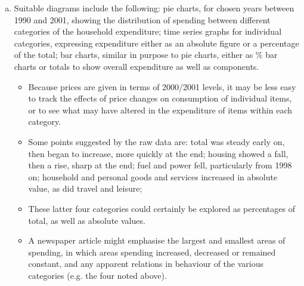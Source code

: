 \documentclass[a4paper,12pt]{article}
\begin{document}
 
\begin{enumerate}[(a)]
\item Suitable diagrams include the following:
pie charts, for chosen years between 1990 and 2001, showing the distribution
of spending between different categories of the household expenditure;
time series graphs for individual categories, expressing expenditure either as
an absolute figure or a percentage of the total;
bar charts, similar in purpose to pie charts, either as \% bar charts or totals to
show overall expenditure as well as components.
\begin{itemize}
    \item Because prices are given in terms of 2000/2001 levels, it may be less easy to track the
effects of price changes on consumption of individual items, or to see what may have
altered in the expenditure of items within each category.
\item Some points suggested by the raw data are:
total was steady early on, then began to increase, more quickly at the end;
housing showed a fall, then a rise, sharp at the end;
fuel and power fell, particularly from 1998 on;
household and personal goods and services increased in absolute value, as did
travel and leisure;
\item These latter four categories could certainly be explored as percentages of total, as well
as absolute values.
\item A newspaper article might emphasise the largest and smallest areas of spending, in
which areas spending increased, decreased or remained constant, and any apparent
relations in behaviour of the various categories (e.g. the four noted above).
\end{itemize}

\end{enumerate}
\end{document}
